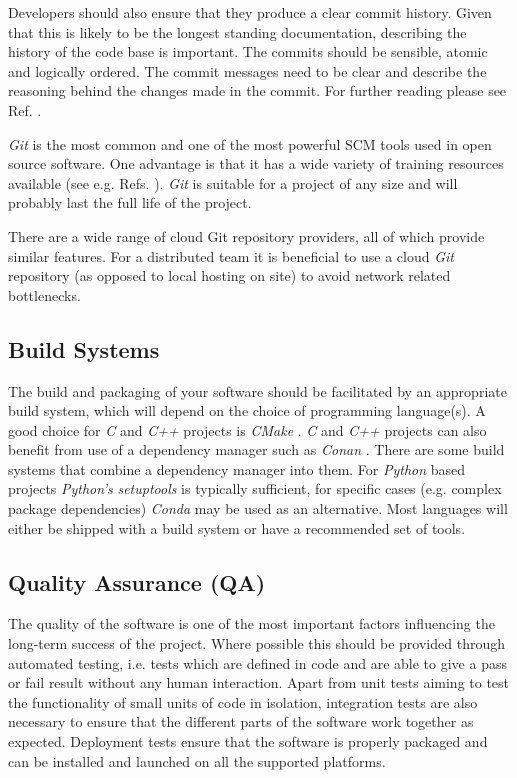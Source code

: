 \documentclass[jnr]{iosart2x}
\begin{document}
Developers should also ensure that they produce a clear commit history.
Given that this is likely to be the longest standing documentation, describing the history of the code base is important.
The commits should be sensible, atomic and logically ordered.
The commit messages need to be clear and describe the reasoning behind the changes made in the commit.
For further reading please see Ref. \cite{git-commit}.

{\it Git} \cite{Git} is the most common and one of the most powerful SCM tools used in open source software.
One advantage is that it has a wide variety of training resources available (see e.g. Refs. \cite{github-git, atlassian-git, codecademy-git}).
{\it Git} is suitable for a project of any size and will probably last the full life of the project.

There are a wide range of cloud Git repository providers, all of which provide similar features.
For a distributed team it is beneficial to use a cloud {\it Git} repository (as opposed to local hosting on site) to avoid network related bottlenecks.

\subsection{Build Systems}
\label{Build systems}

The build and packaging of your software should be facilitated by an appropriate build system, which will depend on the choice of programming language(s).
A good choice for {\it C} and {\it C++} projects is {\it CMake} \cite{CMake}.
{\it C} and {\it C++} projects can also benefit from use of a dependency manager such as {\it Conan} \cite{Conan}.
There are some build systems that combine a dependency manager into them.
For {\it Python} based projects {\it Python's} {\it setuptools} is typically sufficient, for specific cases (e.g. complex package dependencies) {\it Conda} may be used as an alternative.
Most languages will either be shipped with a build system or have a recommended set of tools.

\subsection{Quality Assurance (QA)}
\label{Quality assurance}

The quality of the software is one of the most important factors influencing the long-term success of the project.
Where possible this should be provided through automated testing, i.e. tests which are defined in code and are able to give a pass or fail result without any human interaction.
Apart from unit tests aiming to test the functionality of small units of code in isolation, integration tests are also necessary to ensure that the different parts of the software work together as expected.
Deployment tests ensure that the software is properly packaged and can be installed and launched on all the supported platforms.
\end{document}
